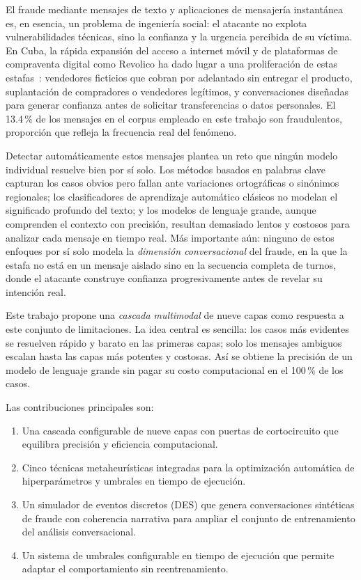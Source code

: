 \documentclass{llncs}
\begin{document}
El fraude mediante mensajes de texto y aplicaciones de mensajería
instantánea es, en esencia, un problema de ingeniería social:
el atacante no explota vulnerabilidades técnicas, sino la confianza
y la urgencia percibida de su víctima.
En Cuba, la rápida expansión del acceso a internet móvil y de
plataformas de compraventa digital como Revolico ha dado lugar
a una proliferación de estas estafas~\cite{almeida2011}:
vendedores ficticios que cobran por adelantado sin entregar el producto,
suplantación de compradores o vendedores legítimos, y conversaciones
diseñadas para generar confianza antes de solicitar transferencias
o datos personales.
El 13.4\,\% de los mensajes en el corpus empleado en este trabajo
son fraudulentos, proporción que refleja la frecuencia real del fenómeno.

Detectar automáticamente estos mensajes plantea un reto
que ningún modelo individual resuelve bien por sí solo.
Los métodos basados en palabras clave capturan los casos obvios
pero fallan ante variaciones ortográficas o sinónimos regionales;
los clasificadores de aprendizaje automático clásicos no modelan
el significado profundo del texto; y los modelos de lenguaje grande,
aunque comprenden el contexto con precisión, resultan demasiado
lentos y costosos para analizar cada mensaje en tiempo real.
Más importante aún: ninguno de estos enfoques por sí solo modela
la \emph{dimensión conversacional} del fraude, en la que la estafa
no está en un mensaje aislado sino en la secuencia completa de
turnos, donde el atacante construye confianza progresivamente
antes de revelar su intención real.

Este trabajo propone una \emph{cascada multimodal} de nueve capas
como respuesta a este conjunto de limitaciones.
La idea central es sencilla: los casos más evidentes se resuelven
rápido y barato en las primeras capas; solo los mensajes ambiguos
escalan hasta las capas más potentes y costosas.
Así se obtiene la precisión de un modelo de lenguaje grande sin
pagar su costo computacional en el 100\,\% de los casos.

Las contribuciones principales son:
\begin{enumerate}
  \item Una cascada configurable de nueve capas con puertas de cortocircuito
        que equilibra precisión y eficiencia computacional.
  \item Cinco técnicas metaheurísticas integradas para la optimización
        automática de hiperparámetros y umbrales en tiempo de ejecución.
  \item Un simulador de eventos discretos (DES) que genera conversaciones
        sintéticas de fraude con coherencia narrativa para ampliar el
        conjunto de entrenamiento del análisis conversacional.
  \item Un sistema de umbrales configurable en tiempo de ejecución
        que permite adaptar el comportamiento sin reentrenamiento.
\end{enumerate}
\end{document}
